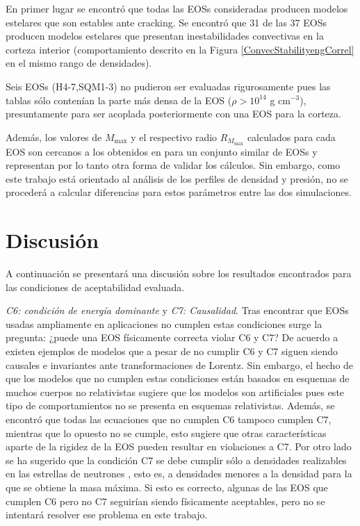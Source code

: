  En primer lugar se encontró que todas las EOSs consideradas producen modelos estelares que son estables ante cracking. Se encontró que 31 de las 37 EOSs producen modelos estelares que presentan inestabilidades convectivas en la corteza interior (comportamiento descrito en la Figura \ref{ConvecStabilityengCorrel} en el mismo rango de densidades).

Seis EOSs (H4-7,SQM1-3) no pudieron ser evaluadas rigurosamente pues las tablas sólo contenían la parte más densa de la EOS ($\rho > 10^{14}$ g cm$^{-3}$), presuntamente para ser acoplada posteriormente con una EOS para la corteza. 

Además, los valores de $M_{\text{max}}$ y el respectivo radio $R_{M_{\text{max}}}$ calculados para cada EOS son cercanos a los obtenidos en \cite{Read2009} para un conjunto similar de EOSs y representan por lo tanto otra forma de validar los cálculos. Sin embargo, como este trabajo está orientado al análisis de los perfiles de densidad y presión, no se procederá a calcular diferencias para estos parámetros entre las dos simulaciones.

\section{Discusión}

\noindent A continuación se presentará una discusión sobre los resultados encontrados para las condiciones de aceptabilidad evaluada.



\emph{C6: condición de energía dominante} y \emph{C7: Causalidad}. Tras encontrar que EOSs usadas ampliamente en aplicaciones no cumplen estas condiciones surge la pregunta: ¿puede una EOS físicamente correcta violar C6 y C7? De acuerdo a \cite{Haensel2007} existen ejemplos de modelos que a pesar de no cumplir C6 y C7 siguen siendo causales e invariantes ante transformaciones de Lorentz. Sin embargo, el hecho de que los modelos que no cumplen estas condiciones están basados en esquemas de muchos cuerpos no relativistas sugiere que los modelos son artificiales pues este tipo de comportamientos no se presenta en esquemas relativistas. Además, se encontró que todas las ecuaciones que no cumplen C6 tampoco cumplen C7, mientras que lo opuesto no se cumple, esto sugiere que otras características aparte de la rigidez de la EOS pueden resultar en violaciones a C7. Por otro lado se ha sugerido que la condición C7 se debe cumplir sólo a densidades realizables en las estrellas de neutrones \cite{Douchin2001}, esto es, a densidades menores a la densidad para la que se obtiene la masa máxima. Si esto es correcto, algunas de las EOS que cumplen C6 pero no C7 seguirían siendo físicamente aceptables, pero no se intentará resolver ese problema en este trabajo.


